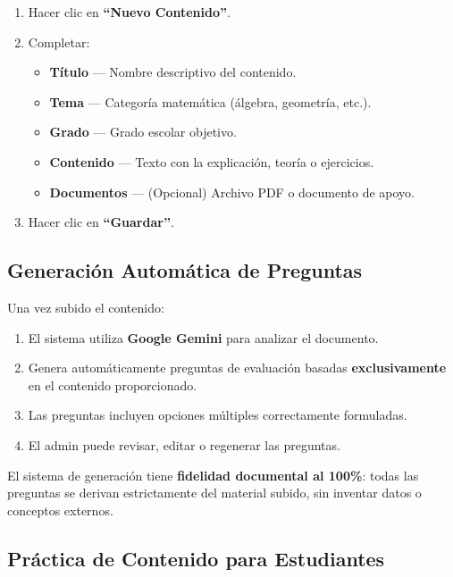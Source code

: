 \documentclass[12pt, a4paper, oneside]{book}
\begin{document}
\begin{stepbox}[title={Subir material educativo}]
\begin{enumerate}
    \item Hacer clic en \textbf{``Nuevo Contenido''}.
    \item Completar:
    \begin{itemize}
        \item \textbf{Título} — Nombre descriptivo del contenido.
        \item \textbf{Tema} — Categoría matemática (álgebra, geometría, etc.).
        \item \textbf{Grado} — Grado escolar objetivo.
        \item \textbf{Contenido} — Texto con la explicación, teoría o ejercicios.
        \item \textbf{Documentos} — (Opcional) Archivo PDF o documento de apoyo.
    \end{itemize}
    \item Hacer clic en \textbf{``Guardar''}.
\end{enumerate}
\end{stepbox}

\subsection{Generación Automática de Preguntas}

Una vez subido el contenido:
\begin{enumerate}
    \item El sistema utiliza \textbf{Google Gemini} para analizar el documento.
    \item Genera automáticamente preguntas de evaluación basadas \textbf{exclusivamente} en el contenido proporcionado.
    \item Las preguntas incluyen opciones múltiples correctamente formuladas.
    \item El admin puede revisar, editar o regenerar las preguntas.
\end{enumerate}

\begin{importantebox}
    El sistema de generación tiene \textbf{fidelidad documental al 100\%}: todas las preguntas se derivan estrictamente del material subido, sin inventar datos o conceptos externos.
\end{importantebox}

\subsection{Práctica de Contenido para Estudiantes}
\end{document}
